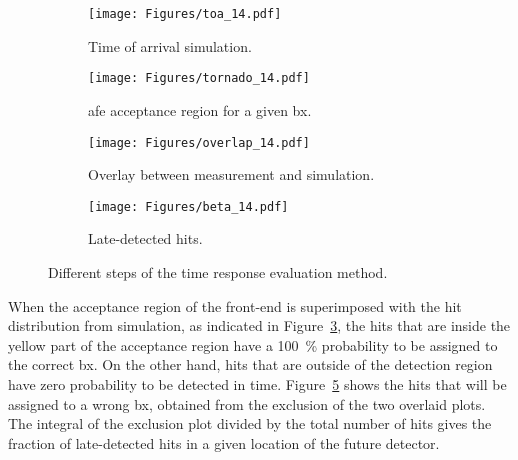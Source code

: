 \begin{figure}[ht]
    \centering
    \captionsetup{justification=centering}
    \begin{subfigure}{0.49\textwidth}
        \centering
        \texttt{[image: Figures/toa\_14.pdf]}
        \caption{Time of arrival simulation.}
        \label{fig:mc}
    \end{subfigure}
    \hfill
    \begin{subfigure}{0.49\textwidth}
        \centering
        \texttt{[image: Figures/tornado\_14.pdf]}
        \caption{\gls{afe} acceptance region for a given \gls{bx}.}
        \label{fig:torproba}
    \end{subfigure}
    \begin{subfigure}{0.49\textwidth}
        \texttt{[image: Figures/overlap\_14.pdf]}
        \caption{Overlay between measurement and simulation.}
        \label{fig:overlap}
    \end{subfigure}
    \hspace{2pt}
    \begin{subfigure}{0.49\textwidth}
        \centering
        \texttt{[image: Figures/beta\_14.pdf]}
        \caption{Late-detected hits.}
        \label{fig:beta}
    \end{subfigure}
    \caption{Different steps of the time response evaluation method.}
\end{figure}

When the acceptance region of the front-end is superimposed with the hit distribution from simulation, as indicated in Figure~\ref{fig:overlap}, the hits that are inside the yellow part of the acceptance region have a \SI{100}{\percent} probability to be assigned to the correct \gls{bx}. On the other hand, hits that are outside of the detection region have zero probability to be detected in time. Figure~\ref{fig:beta} shows the hits that will be assigned to a wrong \gls{bx}, obtained from the exclusion of the two overlaid plots. The integral of the exclusion plot divided by the total number of hits gives the fraction of late-detected hits in a given location of the future detector.

